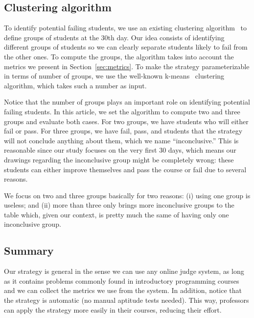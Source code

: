 
\subsection{Clustering algorithm}

\label{sec:clustering}

To identify potential failing students, we use an existing clustering algorithm~\cite{hartigan-clustering-algorithms-1975} to define groups of students at the 30th day. Our idea consists of identifying different groups of students so we can clearly separate students likely to fail from the other ones. To compute the groups, the algorithm takes into account the metrics we present in Section~\ref{sec:metrics}. To make the strategy parameterizable in terms of number of groups, we use the well-known k-means~\cite{k-means-1979} clustering algorithm, which takes such a number as input.

Notice that the number of groups plays an important role on identifying potential failing students. In this article, we set the algorithm to compute two and three groups and evaluate both cases. For two groups, we have students who will either fail or pass. For three groups, we have fail, pass, and students that the strategy will not conclude anything about them, which we name ``inconclusive.'' This is reasonable since our study focuses on the very first 30 days, which means our drawings regarding the inconclusive group might be completely wrong: these students can either improve themselves and pass the course or fail due to several reasons.

We focus on two and three groups basically for two reasons: (i) using one group is useless; and (ii) more than three only brings more inconclusive groups to the table which, given our context, is pretty much the same of having only one inconclusive group.

\subsection{Summary}


Our strategy is general in the sense we can use any online judge system, as long as it contains problems commonly found in introductory programming courses and we can collect the metrics we use from the system. In addition, notice that the strategy is automatic (no manual aptitude tests needed). This way, professors can apply the strategy more easily in their courses, reducing their effort.

